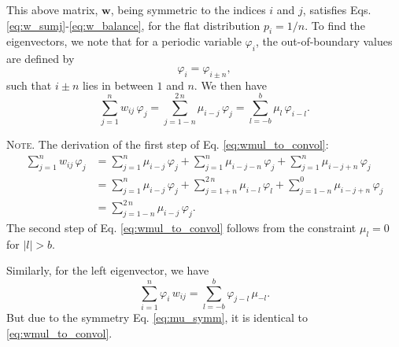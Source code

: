 \documentclass[reprint, floatfix]{revtex4-1}
\newcommand{\note}[1]{{\color{DarkGreen}\footnotesize \textsc{Note.} #1}}
\begin{document}
This above matrix, $\mathbf w$,
being symmetric to the indices $i$ and $j$,
satisfies Eqs. \eqref{eq:w_sumj}-\eqref{eq:w_balance},
for the flat distribution $p_i = 1/n$.
%
To find the eigenvectors,
we note that for a periodic variable $\varphi_i$,
the out-of-boundary values are defined by
%
\begin{equation}
  \varphi_i = \varphi_{i \pm n},
\label{eq:phi_pbc}
\end{equation}
%
such that $i \pm n$ lies in between $1$ and $n$.
%
We then have
%
\begin{equation}
  \sum_{ j = 1 }^n
    w_{ij} \, \varphi_j
  =
  \sum_{ j = 1 - n }^{ 2 \, n }
    \mu_{i - j} \, \varphi_j
  =
  \sum_{ l = -b }^{ b }
    \mu_l \, \varphi_{ i - l}
  .
\label{eq:wmul_to_convol}
\end{equation}
%
\note{The derivation of the first step of
  Eq. \eqref{eq:wmul_to_convol}:
$$
\begin{aligned}
  \sum_{j = 1}^n
    w_{ij} \, \varphi_j
  &=
  \sum_{j = 1}^n
    \mu_{i - j} \, \varphi_j
  +
  \sum_{j = 1}^n
    \mu_{i - j - n} \, \varphi_j
  +
  \sum_{j = 1}^n
    \mu_{i - j + n} \, \varphi_j
  \\
  &=
  \sum_{j = 1}^n
    \mu_{i - j} \, \varphi_j
  +
  \sum_{j = 1+n}^{2 \, n}
    \mu_{i - l} \, \varphi_l
  +
  \sum_{j = 1-n}^0
    \mu_{i - j + n} \, \varphi_j
  \\
  &=
  \sum_{j = 1-n}^{2 \, n}
    \mu_{i - j} \, \varphi_j
  .
\end{aligned}
$$
The second step of Eq. \eqref{eq:wmul_to_convol}
follows from the constraint $\mu_l = 0$ for $|l| > b$.

Similarly,
for the left eigenvector, we have
$$
  \sum_{ i = 1 }^n
    \varphi_i \, w_{ij}
  =
  \sum_{ l = -b }^b
    \varphi_{j - l} \, \mu_{-l}
  .
$$
But due to the symmetry Eq. \eqref{eq:mu_symm},
it is identical to \eqref{eq:wmul_to_convol}.
}
\end{document}
